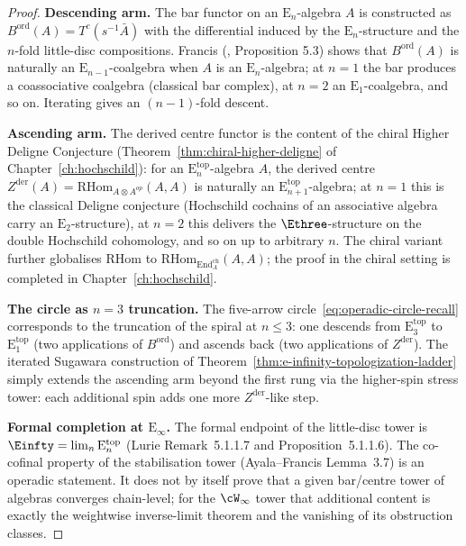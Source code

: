 \begin{proof}
\textbf{Descending arm.}
The bar functor on an $\mathrm{E}_n$-algebra $A$ is constructed as
$B^{\mathrm{ord}}(A) = T^c(s^{-1}\bar A)$ with the differential induced
by the $\mathrm{E}_n$-structure and the $n$-fold
little-disc compositions. Francis (\cite{Francis-tangent}, Proposition
5.3) shows that $B^{\mathrm{ord}}(A)$ is naturally an $\mathrm{E}_{n-1}$-coalgebra
when $A$ is an $\mathrm{E}_n$-algebra; at $n = 1$ the bar produces a
coassociative coalgebra (classical bar complex), at $n = 2$ an
$\mathrm{E}_1$-coalgebra, and so on. Iterating gives an $(n-1)$-fold
descent.

\textbf{Ascending arm.}
The derived centre functor is the content of the chiral Higher Deligne
Conjecture
(Theorem~\ref{thm:chiral-higher-deligne} of
Chapter~\ref{ch:hochschild}): for an $\mathrm{E}_n^{\mathrm{top}}$-algebra
$A$, the derived centre $Z^{\mathrm{der}}(A) = \mathrm{RHom}_{A \otimes A^{op}}(A, A)$
is naturally an $\mathrm{E}_{n+1}^{\mathrm{top}}$-algebra; at $n = 1$ this
is the classical Deligne conjecture (Hochschild cochains of an
associative algebra carry an $\mathrm{E}_2$-structure), at $n = 2$
this delivers the $\Ethree$-structure on the double Hochschild
cohomology, and so on up to arbitrary $n$. The chiral variant
further globalises $\mathrm{RHom}$ to
$\mathrm{RHom}_{\mathrm{End}^{\mathrm{ch}}_A}(A,A)$; the proof in the
chiral setting is completed in Chapter~\ref{ch:hochschild}.

\textbf{The circle as $n = 3$ truncation.}
The five-arrow circle~\eqref{eq:operadic-circle-recall} corresponds to
the truncation of the spiral at $n \le 3$: one descends from
$\mathrm{E}_3^{\mathrm{top}}$ to $\mathrm{E}_1^{\mathrm{top}}$ (two applications of
$B^{\mathrm{ord}}$) and ascends back (two applications of
$Z^{\mathrm{der}}$). The iterated Sugawara construction of
Theorem~\ref{thm:e-infinity-topologization-ladder} simply extends the
ascending arm beyond the first rung via the higher-spin stress tower:
each additional spin adds one more $Z^{\mathrm{der}}$-like step.

\textbf{Formal completion at $\mathrm{E}_\infty$.}
The formal endpoint of the little-disc tower is
$\Einfty = \lim_n \mathrm{E}_n^{\mathrm{top}}$
(Lurie\,\cite{HA}\,Remark~5.1.1.7 and Proposition~5.1.1.6).
The co-cofinal property of the stabilisation tower (Ayala--Francis
\cite{AF15} Lemma~3.7) is an operadic statement. It does not by itself
prove that a given bar/centre tower of algebras converges chain-level;
for the $\cW_\infty$ tower that additional content is exactly the
weightwise inverse-limit theorem and the vanishing of its obstruction
classes.
\end{proof}


